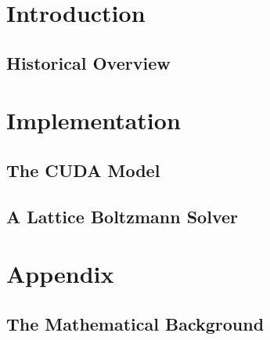 \documentclass{tufte-book}
\begin{document}
\tableofcontents
\chapter{Introduction}
\section{Historical Overview}
\chapter{Implementation}
\section{The CUDA Model}
\section{A Lattice Boltzmann Solver}
\chapter*{Appendix}
\section*{The Mathematical Background}
\end{document}

